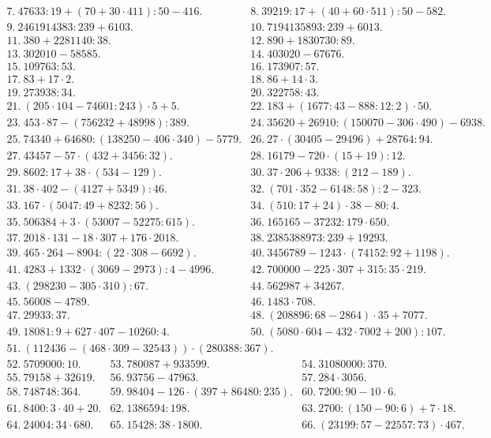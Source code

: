 $\begin{array}{lll}
7.\ 47633:19+(70+30\cdot 411):50-416.&
8.\  39219:17+(40+60\cdot 511):50-582.\\
9.\  2461914383:239+6103.&
10.\  7194135893:239+6013.\\
11.\  380+2281140:38.&
12.\  890+1830730:89.\\
13.\  302010-58585.&
14.\  403020-67676.\\
15.\  109763:53.&
16.\  173907:57.\\
17.\  83+17\cdot 2.&
18.\ 86+14\cdot 3.\\
19.\ 273938:34.&
20.\ 322758:43.\\
21.\ (205\cdot104-74601:243)\cdot5+5.&
22.\ 183+(1677:43-888:12:2)\cdot50.\\
23.\ 453\cdot87-(756232+48998):389.&
24.\ 35620+26910:(150070-306\cdot490)-6938.\\
25.\ 74340+64680:(138250-406\cdot340)-5779.&
26.\ 27\cdot(30405-29496)+28764:94.\\
27.\ 43457-57\cdot(432+3456:32).&
28.\ 16179-720\cdot(15+19):12.\\
29.\ 8602:17+38\cdot(534-129).&
30.\ 37\cdot206+9338:(212-189).\\
31.\ 38\cdot402-(4127+5349):46.&
32.\ (701\cdot352-6148:58):2-323.\\
33.\ 167\cdot(5047:49+8232:56).&
34.\ (510:17+24)\cdot38-80:4.\\
35.\ 506384+3\cdot(53007-52275:615).&
36.\ 165165-37232:179\cdot650.\\
37.\ 2018\cdot131-18\cdot307+176\cdot2018.&
38.\ 2385388973:239+19293.\\
39.\ 465\cdot264-8904:(22\cdot308-6692).&
40.\  3456789-1243\cdot(74152:92+1198).\\
41.\  4283+1332\cdot(3069-2973):4-4996.&
42.\  700000-225\cdot307+315:35\cdot219.\\
43.\  (298230-305\cdot310):67.&
44.\ 562987+34267.\\
45.\ 56008-4789.&
46.\ 1483\cdot708.\\
47.\ 29933:37.&
48.\ (208896:68-2864)\cdot35+7077.\\
49.\  18081:9+627\cdot407-10260:4.&
50.\  (5080\cdot604-432\cdot7002+200):107.\end{array}$\\$\begin{array}{lll}
51.\ (112436-(468\cdot309-32543))\cdot(280388:367).\end{array}$\\
$\begin{array}{lll}
52.\ 5709000:10.&
53.\ 780087+933599.&
54.\ 31080000:370.\\
55.\ 79158+32619.&
56.\ 93756-47963.&
57.\ 284\cdot3056.\\
58.\ 748748:364.&
59.\  98404-126\cdot(397+86480:235).&
60.\ 7200:90-10\cdot6.\\
61.\ 8400:3\cdot40+20.&
62.\ 1386594:198.&
63.\ 2700:(150-90:6)+7\cdot18.\\
64.\ 24004:34\cdot680.&
65.\ 15428:38\cdot1800.&
66.\ (23199:57-22557:73)\cdot467.\end{array}$\\

